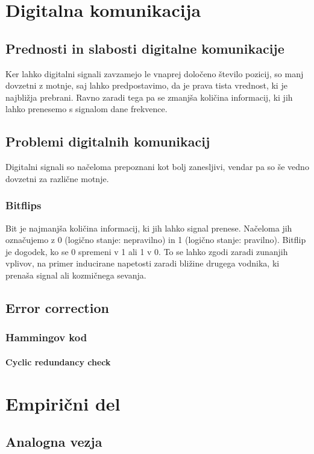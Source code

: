 \documentclass[12pt]{article}
\begin{document}
\newpage
\section{Digitalna komunikacija}
    \subsection{Prednosti in slabosti digitalne komunikacije}
        Ker lahko digitalni signali zavzamejo le vnaprej določeno število 
        pozicij, so manj dovzetni z motnje, saj lahko predpostavimo, da je prava
        tista vrednost, ki je najbližja prebrani. Ravno zaradi tega pa se 
        zmanjša količina informacij, ki jih lahko prenesemo s signalom dane 
        frekvence.
    \subsection{Problemi digitalnih komunikacij}
        Digitalni signali so načeloma prepoznani kot bolj zanesljivi, vendar pa
        so še vedno dovzetni za različne motnje.
        \subsubsection{Bitflips}
            Bit je najmanjša količina informacij, ki jih lahko signal prenese. 
            Načeloma jih označujemo z 0 (logično stanje: nepravilno) in 1 
            (logično stanje: pravilno). Bitflip je dogodek, ko se 0 spremeni v 1
            ali 1 v 0. To se lahko zgodi zaradi zunanjih vplivov, na primer 
            inducirane napetosti zaradi bližine drugega vodnika, ki prenaša 
            signal ali kozmičnega sevanja. 
    \subsection{Error correction}
        \subsubsection{Hammingov kod}
        \paragraph{Cyclic redundancy check}

\newpage
\section{Empirični del}
    \subsection{Analogna vezja}
\end{document}
